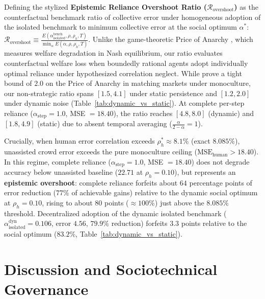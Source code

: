 \documentclass
[letterpaper]{article}
\begin{document}
Defining the stylized \textbf{Epistemic Reliance Overshoot Ratio ($\mathcal{R}_{\text{overshoot}}$)} as the counterfactual benchmark ratio of collective error under homogeneous adoption of the isolated benchmark to minimum collective error at the social optimum $\alpha^*$: $\mathcal{R}_{\text{overshoot}} \equiv \frac{E(\alpha_{\text{isolated}}^{\text{bench}}, \rho, \rho_h, T)}{\min_{\alpha} E(\alpha, \rho, \rho_h, T)}$. Unlike the game-theoretic Price of Anarchy \citep{koutsoupias1999worst, roughgarden2002bad}, which measures welfare degradation in Nash equilibrium, our ratio evaluates counterfactual welfare loss when boundedly rational agents adopt individually optimal reliance under hypothesized correlation neglect. While \citet{kleinberg2026price} prove a tight bound of $2.0$ on the Price of Anarchy in matching markets under monoculture, our non-strategic ratio spans $[1.5, 4.1]$ under static persistence and $[1.2, 2.0]$ under dynamic noise (Table~\ref{tab:dynamic_vs_static}). At complete per-step reliance ($\alpha_{\text{step}} = 1.0$, MSE $= 18.40$), the ratio reaches $[4.8, 8.0]$ (dynamic) and $[1.8, 4.9]$ (static) due to absent temporal averaging ($\frac{\alpha}{2-\alpha} = 1$).

Crucially, when human error correlation exceeds $\rho_h^* \approx 8.1\%$ (exact $8.085\%$), unassisted crowd error exceeds the pure monoculture ceiling ($\text{MSE}_{\text{human}} > 18.40$). In this regime, complete reliance ($\alpha_{\text{step}} = 1.0$, MSE $= 18.40$) does not degrade accuracy below unassisted baseline ($22.71$ at $\rho_h = 0.10$), but represents an \textbf{epistemic overshoot}: complete reliance forfeits about $64$ percentage points of error reduction ($77\%$ of achievable gains) relative to the dynamic social optimum at $\rho_h = 0.10$, rising to about $80$ points ($\approx 100\%$) just above the $8.085\%$ threshold. Decentralized adoption of the dynamic isolated benchmark ($\alpha_{\text{isolated}}^{\text{dyn}} = 0.106$, error $4.56$, $79.9\%$ reduction) forfeits $3.3$ points relative to the social optimum ($83.2\%$, Table~\ref{tab:dynamic_vs_static}).

\section{Discussion and Sociotechnical Governance}
\end{document}
